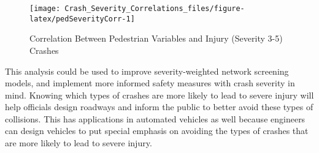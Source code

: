 \documentclass[3p, authoryear]{elsarticle} %
\begin{document}
\begin{figure}

{\centering \texttt{[image: Crash\_Severity\_Correlations\_files/figure-latex/pedSeverityCorr-1]} 

}

\caption{Correlation Between Pedestrian Variables and Injury (Severity 3-5) Crashes}\label{fig:pedSeverityCorr}
\end{figure}

This analysis could be used to improve severity-weighted network screening models, and implement more informed safety measures with crash severity in mind. Knowing which types of crashes are more likely to lead to severe injury will help officials design roadways and inform the public to better avoid these types of collisions. This has applications in automated vehicles as well because engineers can design vehicles to put special emphasis on avoiding the types of crashes that are more likely to lead to severe injury.


\end{document}
